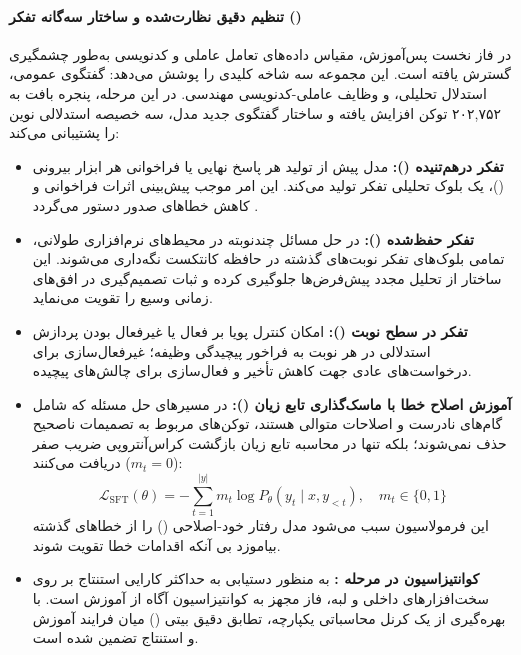 \paragraph*{تنظیم دقیق نظارت‌شده و ساختار سه‌گانه تفکر ()}
در فاز نخست پس‌آموزش، مقیاس داده‌های تعامل عاملی و کدنویسی به‌طور چشمگیری گسترش یافته است. این مجموعه سه شاخه کلیدی را پوشش می‌دهد: گفتگوی عمومی، استدلال تحلیلی، و وظایف عاملی-کدنویسی مهندسی. در این مرحله، پنجره بافت به ۲۰۲,۷۵۲ توکن افزایش یافته و ساختار گفتگوی جدید مدل، سه خصیصه استدلالی نوین را پشتیبانی می‌کند:
\begin{itemize}
    \item \textbf{تفکر درهم‌تنیده ():} مدل پیش از تولید هر پاسخ نهایی یا فراخوانی هر ابزار بیرونی ()، یک بلوک تحلیلی تفکر تولید می‌کند. این امر موجب پیش‌بینی اثرات فراخوانی و کاهش خطاهای صدور دستور می‌گردد \cite{anthropic2025claude45}.
    \item \textbf{تفکر حفظ‌شده ():} در حل مسائل چندنوبته در محیط‌های نرم‌افزاری طولانی، تمامی بلوک‌های تفکر نوبت‌های گذشته در حافظه کانتکست نگه‌داری می‌شوند. این ساختار از تحلیل مجدد پیش‌فرض‌ها جلوگیری کرده و ثبات تصمیم‌گیری در افق‌های زمانی وسیع را تقویت می‌نماید.
    \item \textbf{تفکر در سطح نوبت ():} امکان کنترل پویا بر فعال یا غیرفعال بودن پردازش استدلالی در هر نوبت به فراخور پیچیدگی وظیفه؛ غیرفعال‌سازی برای درخواست‌های عادی جهت کاهش تأخیر و فعال‌سازی برای چالش‌های پیچیده.
    \item \textbf{آموزش اصلاح خطا با ماسک‌گذاری تابع زیان ():} در مسیرهای حل مسئله که شامل گام‌های نادرست و اصلاحات متوالی هستند، توکن‌های مربوط به تصمیمات ناصحیح حذف نمی‌شوند؛ بلکه تنها در محاسبه تابع زیان بازگشت کراس‌آنتروپی ضریب صفر دریافت می‌کنند ($m_t = 0$):
    \begin{equation}
        \mathcal{L}_{\text{SFT}}(\theta) = -\sum_{t=1}^{|y|} m_t \log P_\theta(y_t \mid x, y_{<t}), \quad m_t \in \{0, 1\}
    \end{equation}
    این فرمولاسیون سبب می‌شود مدل رفتار خود-اصلاحی () را از خطاهای گذشته بیاموزد بی آنکه اقدامات خطا تقویت شوند.
    \item \textbf{کوانتیزاسیون  در مرحله :} به منظور دستیابی به حداکثر کارایی استنتاج بر روی سخت‌افزارهای داخلی و لبه، فاز  مجهز به کوانتیزاسیون آگاه از آموزش  است. با بهره‌گیری از یک کرنل محاسباتی یکپارچه، تطابق دقیق بیتی () میان فرایند آموزش و استنتاج تضمین شده است.
\end{itemize}

